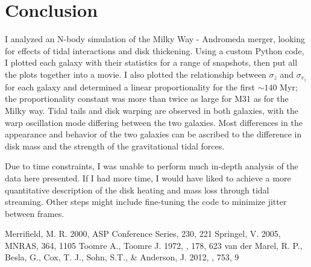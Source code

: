 \documentclass[iop]{emulateapj}
\begin{document}
\section{Conclusion}
I analyzed an N-body simulation of the Milky Way - Andromeda merger, looking for effects of tidal interactions and disk thickening. Using a custom Python code, I plotted each galaxy with their statistics for a range of snapshots, then put all the plots together into a movie. I also plotted the relationship between $\sigma_z$ and $\sigma_{v_z}$ for each galaxy and determined a linear proportionality for the first $\sim 140$ Myr; the proportionality constant was more than twice as large for M31 as for the Milky way. Tidal tails and disk warping are observed in both galaxies, with the warp oscillation mode differing between the two galaxies. Most differences in the appearance and behavior of the two galaxies can be ascribed to the difference in disk mass and the strength of the gravitational tidal forces.

Due to time constraints, I was unable to perform much in-depth analysis of the data here presented. If I had more time, I would have liked to achieve a more quantitative description of the disk heating and mass loss through tidal streaming. Other steps might include fine-tuning the code to minimize jitter between frames.

\begin{thebibliography}{}
 Merrifield, M. R. 2000, ASP Conference Series, 230, 221
 Springel, V. 2005, MNRAS, 364, 1105
 Toomre A., Toomre J. 1972, \apj, 178, 623
 van der Marel, R. P., Besla, G., Cox, T. J., Sohn, S.T., \& Anderson, J. 2012, \apj, 753, 9
\end{thebibliography}
\end{document}
